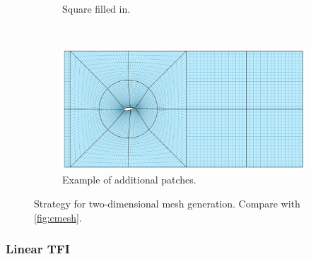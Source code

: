 \documentclass[3p,times,procedia]{elsarticle}
\begin{document}
\begin{figure}
\begin{subfigure}[b]{0.4\textwidth}
    \caption{Square filled in.}
    \label{fig:tfi:4}
  \end{subfigure}
  \\ \vspace{0.4cm}
  \begin{subfigure}[b]{0.7\textwidth}
    \includegraphics[width=\textwidth]{figs/tfi-5}
    \caption{Example of additional patches.}
    \label{fig:tfi:5}
  \end{subfigure}
  \caption{Strategy for two-dimensional mesh generation.  Compare with \autoref{fig:cmesh}.}
  \label{fig:tfi}
\end{figure}

\subsubsection{Linear TFI}
\end{document}
